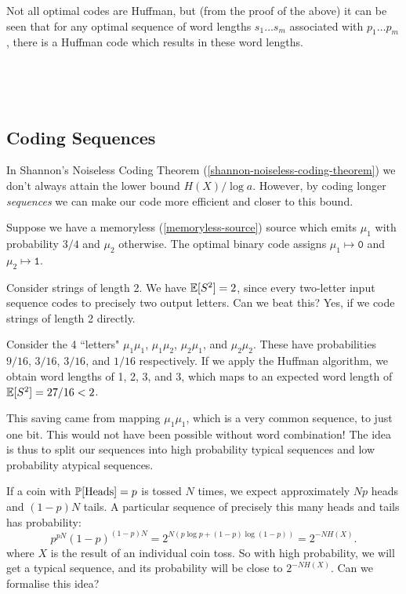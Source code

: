 \documentclass{article}
\begin{document}
\begin{note}
	Not all optimal codes are Huffman,
	but (from the proof of the above) it can be seen that
	for any optimal sequence of word lengths $s_1 \dots s_m$
	associated with $p_1 \dots p_m$,
	there is a Huffman code which results in these word lengths.
\end{note}

\

\


\subsection{Coding Sequences}
\label{section-noiseless-coding-sequences}

In Shannon's Noiseless Coding Theorem (\ref{shannon-noiseless-coding-theorem})
we don't always attain the lower bound $H(X) / \log a$.
However, by coding longer \textit{sequences}
we can make our code more efficient and closer to this bound.

\begin{example}
    Suppose we have a memoryless (\ref{memoryless-source}) source
    which emits $\mu_1$ with probability $3/4$ and $\mu_2$ otherwise.
    The optimal binary code assigns
    $\mu_1 \mapsto \texttt{0}$ and $\mu_2 \mapsto \texttt{1}$.
    
    Consider strings of length 2.
    We have $\E[S^2] = 2$,
    since every two-letter input sequence codes to precisely two output letters.
    Can we beat this? Yes, if we code strings of length 2 directly.
    
    Consider the 4 ``letters"
    $\mu_1\mu_1$, $\mu_1\mu_2$, $\mu_2\mu_1$, and $\mu_2\mu_2$.
    These have probabilities $9/16$, $3/16$, $3/16$, and $1/16$ respectively.
    If we apply the Huffman algorithm,
    we obtain word lengths of 1, 2, 3, and 3,
    which maps to an expected word length of $\E[S^2] = 27/16 < 2$.
    
    This saving came from mapping $\mu_1 \mu_1$,
    which is a very common sequence, to just one bit.
    This would not have been possible without word combination!
    The idea is thus to split our sequences into
    high probability typical sequences and
    low probability atypical sequences.
\end{example}

If a coin with $\P[\text{Heads}] = p$ is tossed $N$ times,
we expect approximately $Np$ heads and $(1-p)N$ tails.
A particular sequence of precisely this many heads and tails has probability:
\[
p^{pN} (1-p)^{(1-p)N} =
2^{N(p \log p + (1-p)\log(1-p))} =
2^{-NH(X)}.
\]
where $X$ is the result of an individual coin toss.
So with high probability, we will get a typical sequence,
and its probability will be close to $2^{-NH(X)}$.
Can we formalise this idea?
\end{document}
